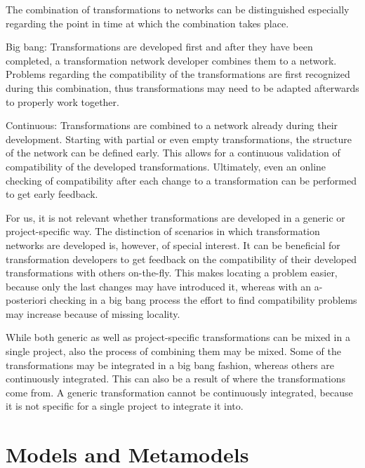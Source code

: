 The combination of transformations to networks can be distinguished especially regarding the point in time at which the combination takes place.
\begin{properdescription}
    \item[Big bang:] Transformations are developed first and after they have been completed, a transformation network developer combines them to a network. Problems regarding the compatibility of the transformations are first recognized during this combination, thus transformations may need to be adapted afterwards to properly work together.
    \item[Continuous:] Transformations are combined to a network already during their development. Starting with partial or even empty transformations, the structure of the network can be defined early. This allows for a continuous validation of compatibility of the developed transformations. Ultimately, even an online checking of compatibility after each change to a transformation can be performed to get early feedback.
\end{properdescription}

For us, it is not relevant whether transformations are developed in a generic or project-specific way.
The distinction of scenarios in which transformation networks are developed is, however, of special interest.
It can be beneficial for transformation developers to get feedback on the compatibility of their developed transformations with others on-the-fly.
This makes locating a problem easier, because only the last changes may have introduced it, whereas with an a-posteriori checking in a big bang process the effort to find compatibility problems may increase because of missing locality.

While both generic as well as project-specific transformations can be mixed in a single project, also the process of combining them may be mixed.
Some of the transformations may be integrated in a big bang fashion, whereas others are continuously integrated.
This can also be a result of where the transformations come from.
A generic transformation cannot be continuously integrated, because it is not specific for a single project to integrate it into.


\section{Models and Metamodels}
\label{chap:networks:models}

